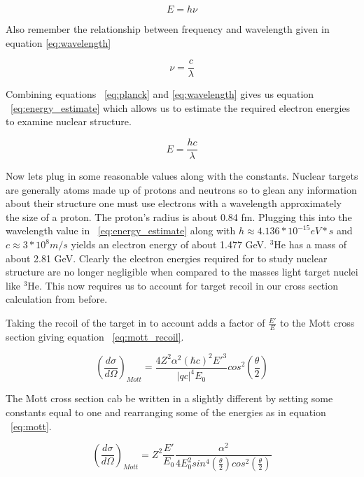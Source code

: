 \begin{equation} \label{eq:planck}
	E = h\nu
\end{equation}

\noindent Also remember the relationship between frequency and wavelength given in equation \ref{eq:wavelength}

\begin{equation} \label{eq:wavelength}
	\nu = \frac{c}{\lambda}
\end{equation}

\noindent Combining equations ~\ref{eq:planck} and \ref{eq:wavelength} gives us equation ~\ref{eq:energy_estimate} which allows us to estimate the required electron energies to examine nuclear structure. 

\begin{equation} \label{eq:energy_estimate}
	E = \frac{hc}{\lambda}
\end{equation}

Now lets plug in some reasonable values along with the constants. Nuclear targets are generally atoms made up of protons and neutrons so to glean any information about their structure one must use electrons with a wavelength approximately the size of a proton. The proton's radius is about 0.84 fm. Plugging this into the wavelength value in ~\ref{eq:energy_estimate} along with $h \approx 4.136 *10^{-15} eV*s$ and $c\approx 3*10^{8} m/s$ yields an electron energy of about 1.477 GeV. $^3$He has a mass of about 2.81 GeV. Clearly the electron energies required for to study nuclear structure are no longer negligible when compared to the masses light target nuclei like $^3$He. This now requires us to account for target recoil in our cross section calculation from before.

Taking the recoil of the target in to account adds a factor of $\frac{E'}{E}$ to the Mott cross section giving equation ~\ref{eq:mott_recoil}.

\begin{equation} \label{eq:mott_recoil}
\left(\frac{d\sigma}{d\Omega}\right)_{Mott} = \frac{4Z^2\alpha^2\left(\hbar c\right)^2E'^3}{|qc|^4 E_0} cos^2 \left( \frac{\theta}{2} \right)
\end{equation}

\noindent The Mott cross section cab be written in a slightly different by setting some constants equal to one and rearranging some of the energies as in equation ~\ref{eq:mott}.

\begin{equation} \label{eq:mott}
\left(\frac{d\sigma}{d\Omega}\right)_{Mott} = Z^2 \frac{E'}{E_0} \frac{\alpha^2}{4E_0^2 sin^4\left( \frac{\theta}{2} \right) cos^2\left( \frac{\theta}{2} \right)}
\end{equation}

